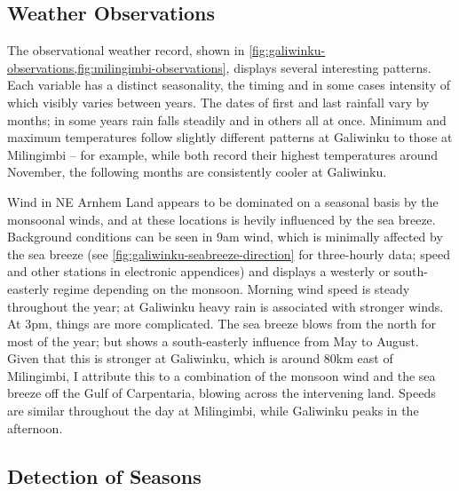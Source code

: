 


\subsection{Weather Observations}

The observational weather record, shown in
\cref{fig:galiwinku-observations,fig:milingimbi-observations}, displays
several interesting patterns.  Each variable has a distinct seasonality,
the timing and in some cases intensity of which visibly varies between
years.  The dates of first and last rainfall vary by months; in some
years rain falls steadily and in others all at once.
%
Minimum and maximum temperatures follow slightly different patterns at
Galiwinku to those at Milingimbi -- for example, while both record their
highest temperatures around November, the following months are consistently
cooler at Galiwinku.

Wind in NE Arnhem Land appears to be dominated on a seasonal basis by the
monsoonal winds, and at these locations is hevily influenced by the sea
breeze.  Background conditions can be seen in 9am wind, which is minimally
affected by the sea breeze (see \cref{fig:galiwinku-seabreeze-direction}
for three-hourly data; speed and other stations in electronic appendices)
and displays a westerly or south-easterly regime depending on the monsoon.
Morning wind speed is steady throughout the year; at Galiwinku heavy rain
is associated with stronger winds.
%
At 3pm, things are more complicated.  The sea breeze blows from the north
for most of the year; but shows a south-easterly influence from May to
August.  Given that this is stronger at Galiwinku, which is around 80km
east of Milingimbi, I attribute this to a combination of the monsoon wind
and the sea breeze off the Gulf of Carpentaria, blowing across the intervening
land.  Speeds are similar throughout the day at Milingimbi, while Galiwinku
peaks in the afternoon.



\subsection{Detection of Seasons}
\label{subsec:disc-season-detection}

